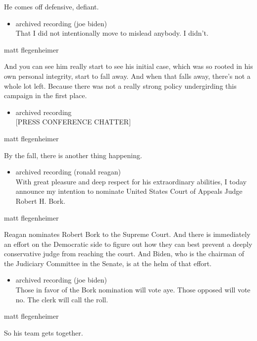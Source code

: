 He comes off defensive, defiant.

\begin{itemize}
\tightlist
\item
  archived recording (joe biden)\\
  That I did not intentionally move to mislead anybody. I didn't.
\end{itemize}

matt flegenheimer

And you can see him really start to see his initial case, which was so
rooted in his own personal integrity, start to fall away. And when that
falls away, there's not a whole lot left. Because there was not a really
strong policy undergirding this campaign in the first place.

\begin{itemize}
\tightlist
\item
  archived recording\\
  {[}PRESS CONFERENCE CHATTER{]}
\end{itemize}

matt flegenheimer

By the fall, there is another thing happening.

\begin{itemize}
\tightlist
\item
  archived recording (ronald reagan)\\
  With great pleasure and deep respect for his extraordinary abilities,
  I today announce my intention to nominate United States Court of
  Appeals Judge Robert H. Bork.
\end{itemize}

matt flegenheimer

Reagan nominates Robert Bork to the Supreme Court. And there is
immediately an effort on the Democratic side to figure out how they can
best prevent a deeply conservative judge from reaching the court. And
Biden, who is the chairman of the Judiciary Committee in the Senate, is
at the helm of that effort.

\begin{itemize}
\tightlist
\item
  archived recording (joe biden)\\
  Those in favor of the Bork nomination will vote aye. Those opposed
  will vote no. The clerk will call the roll.
\end{itemize}

matt flegenheimer

So his team gets together.


